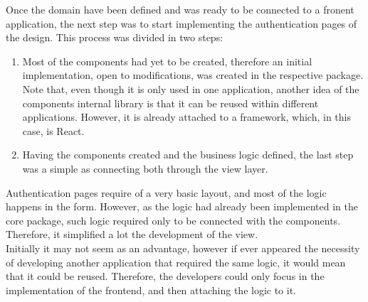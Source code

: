 \documentclass[../memory.tex]{subfiles}
\begin{document}
Once the domain have been defined and was ready to be connected to a fronent
application, the next step was to start implementing the authentication pages of
the design. This process was divided in two steps:
\begin{enumerate}[label = \arabic{*}.]
	\item Most of the components had yet to be created, therefore an initial
	      implementation, open to modifications, was created in the respective
	      package. Note that, even though it is only used in one application, another
	      idea of the components internal library is that it can be reused within
	      different applications. However, it is already attached to a framework,
	      which, in this case, is React.
	\item Having the components created and the business logic defined, the last
	      step was a simple as connecting both through the view layer.
\end{enumerate}
Authentication pages require of a very basic layout, and most of the logic
happens in the form. However, as the logic had already been implemented in the
core package, such logic required only to be connected with the components.
Therefore, it simplified a lot the development of the view.
\\[8pt]
Initially it may not seem as an advantage, however if ever appeared the
necessity of developing another application that required the same logic, it
would mean that it could be reused. Therefore, the developers could only focus
in the implementation of the frontend, and then attaching the logic to it.
\end{document}
